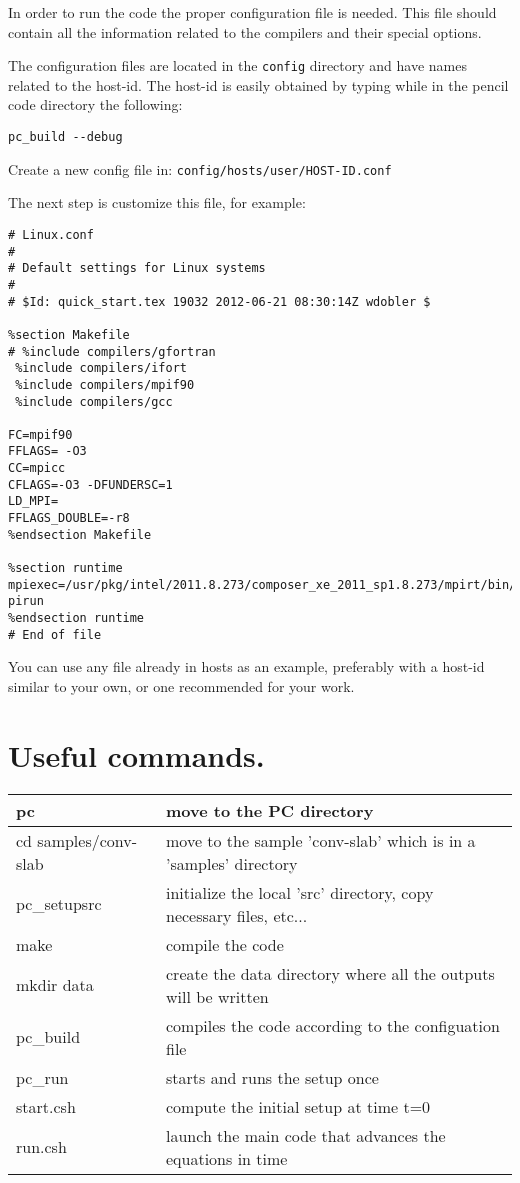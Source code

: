 \documentclass[a4paper,12pt]{article}
\begin{document}
In order to run the code the proper configuration file is needed. This file should contain all the information related to the compilers and their special options.

The configuration files are located in the \verb|config| directory and have names related to the host-id. The host-id is easily obtained by typing while in the pencil code directory the following:  
\begin{verbatim}
pc_build --debug
\end{verbatim}

Create a new config file in:
\texttt{config/hosts/user/HOST-ID.conf}

The next step is customize this file, for example:
\begin{verbatim}
# Linux.conf
#
# Default settings for Linux systems
#
# $Id: quick_start.tex 19032 2012-06-21 08:30:14Z wdobler $

%section Makefile
# %include compilers/gfortran
 %include compilers/ifort
 %include compilers/mpif90
 %include compilers/gcc

FC=mpif90 
FFLAGS= -O3  
CC=mpicc 
CFLAGS=-O3 -DFUNDERSC=1 
LD_MPI= 
FFLAGS_DOUBLE=-r8 
%endsection Makefile

%section runtime
mpiexec=/usr/pkg/intel/2011.8.273/composer_xe_2011_sp1.8.273/mpirt/bin/intel64/m
pirun
%endsection runtime
# End of file
\end{verbatim}

You can use any file already in hosts as an example, preferably with a 
host-id similar to your own, or one recommended for your work.

\section{Useful commands.}
\begin{center}
\begin{tabular}{|l|l|}\hline
pc & move to the PC directory\\\hline
cd samples/conv-slab & move to the sample 'conv-slab' which is in a 'samples'
directory\\\hline
pc\_setupsrc & initialize the local 'src' directory, copy necessary files,
etc...\\\hline
make & 	compile the code\\\hline
mkdir data & create the data directory where all the outputs will be written
\\\hline
pc\_build & compiles the code according to the configuation file\\\hline
pc\_run & starts and runs the setup once\\\hline
start.csh & compute the initial setup at time t=0 \\\hline
run.csh & launch the main code that advances the equations in time\\\hline
\end{tabular}
\end{center}
\end{document}

